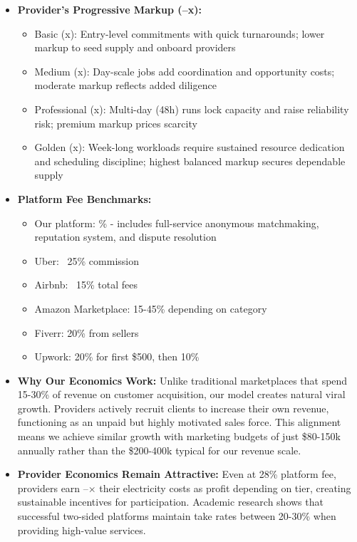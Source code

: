 \begin{itemize}
  \item \textbf{Provider's Progressive Markup (\numfpeval{\patrickMarkupBasic}--\numfpeval{\patrickMarkupGolden}x):} 
  \begin{itemize}
    \item Basic (\numfpeval{\patrickMarkupBasic}x): Entry-level commitments with quick turnarounds; lower markup to seed supply and onboard providers
    \item Medium (\numfpeval{\patrickMarkupMedium}x): Day-scale jobs add coordination and opportunity costs; moderate markup reflects added diligence
    \item Professional (\numfpeval{\patrickMarkupProfessional}x): Multi-day (48h) runs lock capacity and raise reliability risk; premium markup prices scarcity
    \item Golden (\numfpeval{\patrickMarkupGolden}x): Week-long workloads require sustained resource dedication and scheduling discipline; highest balanced markup secures dependable supply
  \end{itemize}
  \item \textbf{Platform Fee Benchmarks:}
  \begin{itemize}
    \item Our platform: \markPlatformFeePercent\% - includes full-service anonymous matchmaking, reputation system, and dispute resolution
    \item Uber: ~25\% commission\cite{uber2023}
    \item Airbnb: ~15\% total fees\cite{airbnb2023}  
    \item Amazon Marketplace: 15-45\% depending on category\cite{amazon2024}
    \item Fiverr: 20\% from sellers\cite{fiverr2023}
    \item Upwork: 20\% for first \$500, then 10\%\cite{upwork2023}
  \end{itemize}
  
  \item \textbf{Why Our Economics Work:} Unlike traditional marketplaces that spend 15-30\% of revenue on customer acquisition\cite{andreessen2020}, our model creates natural viral growth. Providers actively recruit clients to increase their own revenue, functioning as an unpaid but highly motivated sales force. This alignment means we achieve similar growth with marketing budgets of just \$80-150k annually rather than the \$200-400k typical for our revenue scale.
  
  \item \textbf{Provider Economics Remain Attractive:} Even at 28\% platform fee, providers earn --$\times$ their electricity costs as profit depending on tier, creating sustainable incentives for participation. Academic research shows that successful two-sided platforms maintain take rates between 20-30\% when providing high-value services\cite{rochet2003,hagiu2015}.
\end{itemize}



